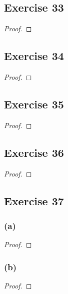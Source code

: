 \documentclass[14pt]{extarticle}
\begin{document}
\subsection{Exercise 33}

\begin{proof}

\end{proof}

\subsection{Exercise 34}

\begin{proof}

\end{proof}

\subsection{Exercise 35}

\begin{proof}

\end{proof}

\subsection{Exercise 36}

\begin{proof}

\end{proof}

\subsection{Exercise 37}
\subsubsection{(a)}

\begin{proof}

\end{proof}

\subsubsection{(b)}

\begin{proof}

\end{proof}
\end{document}
